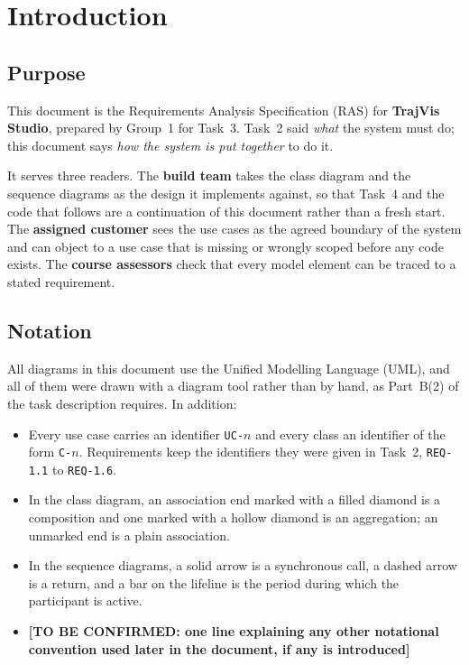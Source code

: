 \documentclass[12pt,a4paper]{report}
\newcommand{\tbd}[1]{{\color{red}\textbf{[TO BE CONFIRMED: #1]}}}
\begin{document}
\tableofcontents
{}
\listoffigures
{}
\listoftables
{}

\clearpage
{}

\chapter{Introduction}
\label{ch:intro}

\section{Purpose}
\label{sec:purpose}

This document is the Requirements Analysis Specification (RAS) for
\textbf{TrajVis Studio}, prepared by Group~1 for Task~3. Task~2 said
\emph{what} the system must do; this document says \emph{how the system is
put together} to do it.

It serves three readers. The \textbf{build team} takes the class diagram and
the sequence diagrams as the design it implements against, so that Task~4
and the code that follows are a continuation of this document rather than a
fresh start. The \textbf{assigned customer} sees the use cases as the agreed
boundary of the system and can object to a use case that is missing or
wrongly scoped before any code exists. The \textbf{course assessors} check
that every model element can be traced to a stated requirement.

\section{Notation}
\label{sec:notation}

All diagrams in this document use the Unified Modelling Language (UML), and
all of them were drawn with a diagram tool rather than by hand, as Part~B(2)
of the task description requires. In addition:

\begin{itemize}
  \item Every use case carries an identifier \texttt{UC-$n$} and every class
    an identifier of the form \texttt{C-$n$}. Requirements keep the
    identifiers they were given in Task~2, \texttt{REQ-1.1} to
    \texttt{REQ-1.6}.
  \item In the class diagram, an association end marked with a filled diamond
    is a composition and one marked with a hollow diamond is an aggregation;
    an unmarked end is a plain association.
  \item In the sequence diagrams, a solid arrow is a synchronous call, a
    dashed arrow is a return, and a bar on the lifeline is the period during
    which the participant is active.
  \item \tbd{one line explaining any other notational convention used later
    in the document, if any is introduced}
\end{itemize}
\end{document}
